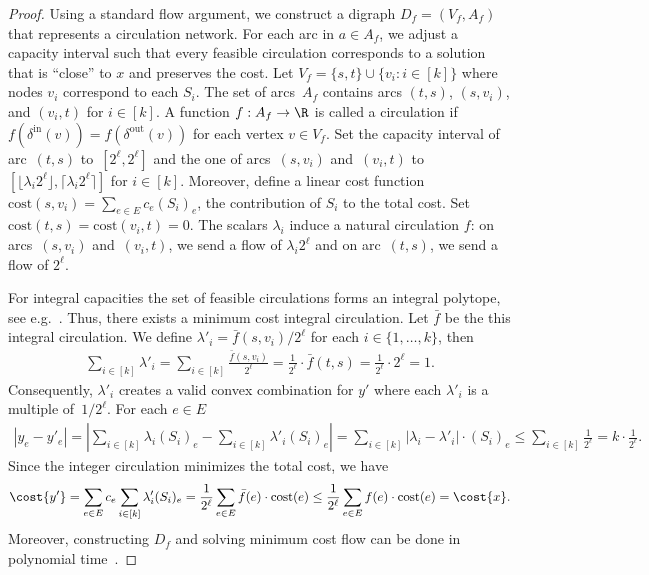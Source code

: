 \documentclass[a4paper,USenglish,cleveref,thm-restate]{lipics-v2021}
\begin{document}
\begin{proof}
    Using a standard flow argument,
    we construct a digraph $D_f = (V_f, A_f)$ that represents a circulation network. For each arc in $a \in A_f$, we adjust a capacity interval such that every feasible circulation corresponds to a solution that is ``close'' to $x$ and preserves the cost. Let $V_f =\{ s, t \} \cup \{ v_i : i\in [k]\}$ where nodes $v_i$ correspond to each $S_i$. The set of arcs~$A_f$ contains arcs $(t, s)$, $(s,v_i)$, and $(v_i,t)$ for $i \in [k]$. A function $f: A_f \rightarrow \R$ is called a circulation if $f(\delta^{\mathrm{in}}(v)) = f(\delta^{\mathrm{out}}(v))$ for each vertex $v \in V_f$. 
    Set the capacity interval of arc~$(t,s)$ to~$[2^\ell, 2^\ell]$ and
    the one of arcs~$(s,v_i)$ and~$(v_i, t)$ to $[\lfloor \lambda_i 2^\ell \rfloor, \lceil \lambda_i 2^\ell \rceil]$ for $i \in [k]$. 
    Moreover, define a linear cost function $\mathrm{cost}(s,v_i) = \sum_{e \in E} c_e (S_i)_e$, the contribution of $S_i$ to the total cost.
    Set $\mathrm{cost}(t,s) = \mathrm{cost}(v_i, t) = 0$.
    The scalars $\lambda_i$ induce a natural circulation $f$: on 
    arcs~$(s, v_i)$ and~$(v_i, t)$, we send a flow of $\lambda_i 2^\ell$
    and on arc~$(t, s)$, we send a flow of $2^\ell$.
    
    For integral capacities the set of feasible circulations forms an integral polytope, see e.g.~\cite[Corollary 13.10b]{schrijver2003combinatorial}.
    Thus, there exists a minimum cost integral circulation. Let $\bar{f}$ be the this integral circulation. We define $\lambda'_i = \bar{f}(s, v_i) / 2^\ell$ for each $i\in\{1,\dotsc,k\}$, then
    \begin{align*}
    \sum_{i \in [k]} \lambda'_i = \sum_{i \in [k]} \frac{ \bar{f}(s,v_i)}{2^\ell} = \frac{1}{2^\ell} \cdot \bar{f}(t, s) = \frac{1}{2^\ell} \cdot 2^\ell  = 1.
    \end{align*}
    Consequently, $\lambda'_i$ creates a valid convex combination for $y'$ where each $\lambda'_i$ is a multiple of~$1/2^\ell$. For each $e \in E$
    \begin{align*}
    |y_e - y'_e| =  \left| \sum_{i \in [k]} \lambda_i (S_i)_e - \sum_{i \in [k]} \lambda'_i (S_i)_e \right| =  \sum_{i \in [k]} |\lambda_i - \lambda'_i| \cdot (S_i)_e \leq \sum_{i \in [k]} \frac{1}{2^\ell} = k \cdot \frac{1}{2^\ell}.
    \end{align*}
    Since the integer circulation minimizes the total cost, we have
    \begin{equation}
        \label{eq:psr-total-rounded-cost}
        \cost{y'} = \sum_{e\in E} c_e \sum_{i \in [k]} \lambda'_i (S_i)_e = \frac{1}{2^\ell} \sum_{e \in E} \bar{f}(e) \cdot \mathrm{cost}(e)
        \le \frac{1}{2^\ell} \sum_{e \in E} f(e) \cdot \mathrm{cost}(e)
        = \cost{x}.
    \end{equation}
    Moreover, constructing $D_f$ and solving minimum cost flow can be done in polynomial time~\cite{schrijver2003combinatorial}.
\end{proof}
\end{document}
